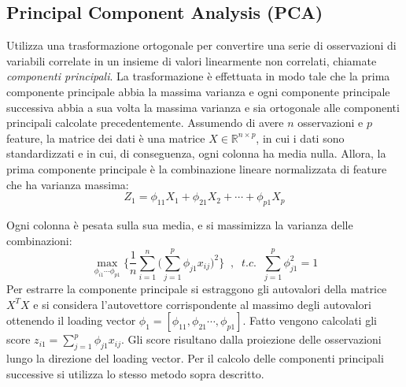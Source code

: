 \documentclass[11pt,a4paper,twocolumn]{article}
\begin{document}
\subsection{Principal Component Analysis (PCA)}
Utilizza una trasformazione ortogonale per convertire una serie di osservazioni di variabili correlate in un insieme di valori linearmente non correlati, chiamate \emph{componenti principali}. La trasformazione è effettuata in modo tale che la prima componente principale abbia la massima varianza e ogni componente principale successiva abbia a sua volta la massima varianza e sia ortogonale alle componenti principali calcolate precedentemente. Assumendo di avere $ n $ osservazioni e $ p $ feature, la matrice dei dati è una matrice $ X \in \mathbb{R}^{n \times p} $, in cui i dati sono standardizzati e in cui, di conseguenza, ogni colonna ha media nulla. Allora, la prima componente principale è la combinazione lineare normalizzata di feature che ha varianza massima:
\begin{equation}
\nonumber
Z_1=\phi_{11}X_1+\phi_{21}	X_2+\cdots+\phi_{p1}	X_p
\end{equation}

 Ogni colonna è pesata sulla sua media, e si massimizza la varianza delle combinazioni:
\begin{equation}
\nonumber
\max_{\phi_{i1} \cdots \phi_{p1}}{\biggl\{\frac{1}{n} \sum_{i=1}^n{\biggl(\sum_{j=1}^p{\phi_{j1}x_{ij}}\biggr)^2}\biggr\}} \; \; , \; \; t.c. \; \; \sum_{j=1}^p{\phi_{j1}^2}=1
\end{equation}
Per estrarre la componente principale si estraggono gli autovalori della matrice $X^TX$ e si considera l'autovettore corrispondente al massimo degli autovalori ottenendo il loading vector $\phi_1=[\phi_{11},\phi_{21} \cdots , \phi_{p1}]$. Fatto vengono calcolati gli score $z_{i1}=\sum_{j=1}^p{\phi_{j1} x_{ij}}$. Gli score risultano dalla proiezione delle osservazioni lungo la direzione del loading vector. Per il calcolo delle componenti principali successive si utilizza lo stesso metodo sopra descritto.
\end{document}

